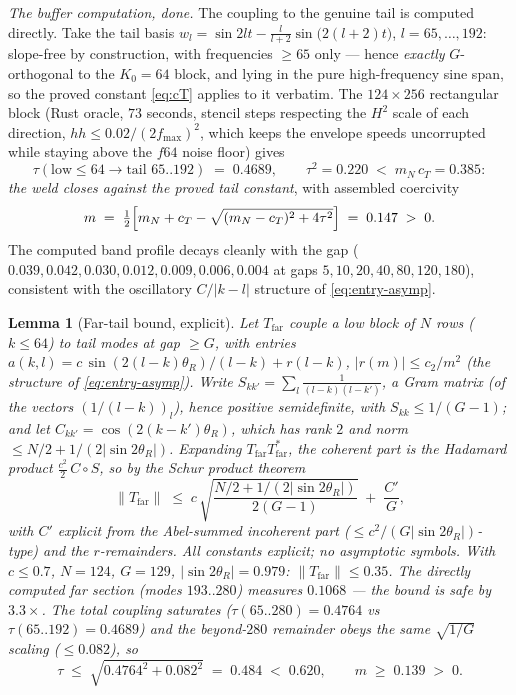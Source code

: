 \documentclass[11pt]{amsart}
\theoremstyle{plain}
\newtheorem{lemma}[theorem]{Lemma}
\theoremstyle{definition}
\begin{document}
\emph{The buffer computation, done.}  The coupling to the genuine
tail is computed directly.  Take the tail basis
$w_{l} = \sin 2lt - \tfrac{l}{l+2}\sin\bigl(2(l+2)t\bigr)$,
$l = 65,\dots,192$: slope-free by construction, with frequencies
$\geq65$ only --- hence \emph{exactly} $G$-orthogonal to the
$K_{0}=64$ block, and lying in the pure high-frequency sine span, so
the proved constant \eqref{eq:cT} applies to it verbatim.  The
$124\times256$ rectangular block (Rust oracle, $73$ seconds, stencil
steps respecting the $H^{2}$ scale of each direction,
$hh \leq 0.02/(2f_{\max})^{2}$, which keeps the envelope speeds
uncorrupted while staying above the $f64$ noise floor) gives
\begin{equation}\label{eq:tau-computed}
   \tau(\text{low}\leq64 \to \text{tail } 65..192) \;=\; 0.4689 ,
   \qquad
   \tau^{2} = 0.220 \;<\; m_{N}\,c_{T} = 0.385 :
\end{equation}
\emph{the weld closes against the proved tail constant}, with
assembled coercivity
\[
   m \;=\; \tfrac12\Bigl[m_{N}+c_{T}
   -\sqrt{(m_{N}-c_{T})^{2}+4\tau^{2}}\Bigr]
   \;=\; 0.147 \;>\; 0 .
\]
The computed band profile decays cleanly with the gap
($0.039, 0.042, 0.030, 0.012, 0.009, 0.006, 0.004$ at gaps
$5,10,20,40,80,120,180$), consistent with the oscillatory
$C/|k-l|$ structure of \eqref{eq:entry-asymp}.

\begin{lemma}[Far-tail bound, explicit]\label{lem:fartail}
Let $T_{\mathrm{far}}$ couple a low block of $N$ rows ($k\leq64$) to
tail modes at gap $\geq G$, with entries $a(k,l) =
c\,\sin(2(l-k)\theta_{R})/(l-k) + r(l-k)$, $|r(m)|\leq c_{2}/m^{2}$
(the structure of \eqref{eq:entry-asymp}).  Write $S_{kk'} =
\sum_{l} \frac{1}{(l-k)(l-k')}$, a \emph{Gram} matrix (of the vectors
$(1/(l-k))_{l}$), hence positive semidefinite, with $S_{kk}\leq
1/(G-1)$; and let $C_{kk'} = \cos(2(k-k')\theta_{R})$, which has rank
$2$ and norm $\leq N/2 + 1/(2|\sin2\theta_{R}|)$.  Expanding
$T_{\mathrm{far}}T_{\mathrm{far}}^{*}$, the coherent part is the
Hadamard product $\tfrac{c^{2}}{2}\,C\circ S$, so by the Schur
product theorem
\[
   \|T_{\mathrm{far}}\|
   \;\leq\; c\,\sqrt{\frac{N/2 + 1/(2|\sin2\theta_{R}|)}{2(G-1)}}
   \;+\; \frac{C'}{G},
\]
with $C'$ explicit from the Abel-summed incoherent part
($\leq c^{2}/(G|\sin2\theta_{R}|)$-type) and the $r$-remainders.
All constants explicit; no asymptotic symbols.  With
$c \leq 0.7$, $N = 124$, $G = 129$, $|\sin2\theta_{R}| = 0.979$:
$\|T_{\mathrm{far}}\| \leq 0.35$.  The directly computed far section
(modes $193..280$) measures $0.1068$ --- the bound is safe by
$3.3\times$.  The total coupling saturates
($\tau(65..280) = 0.4764$ vs $\tau(65..192)=0.4689$) and the
beyond-$280$ remainder obeys the same $\sqrt{1/G}$ scaling
($\leq0.082$), so
\[
   \tau \;\leq\; \sqrt{0.4764^{2}+0.082^{2}} \;=\; 0.484
   \;<\; 0.620,
   \qquad
   m \;\geq\; 0.139 \;>\; 0 .
\]
\end{lemma}
\end{document}
